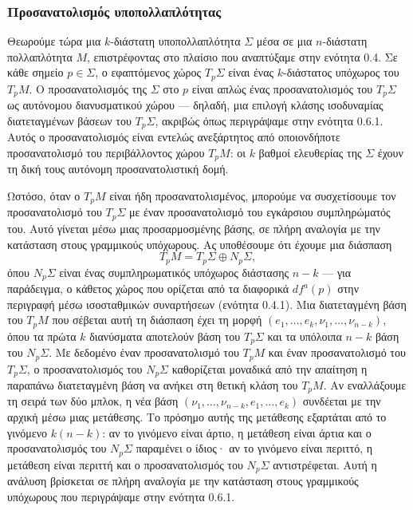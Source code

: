 \documentclass[12pt]{article}
\begin{document}
\subsubsection{Προσανατολισμός υποπολλαπλότητας}

Θεωρούμε τώρα μια $k$-διάστατη υποπολλαπλότητα $\Sigma$ μέσα σε μια $n$-διάστατη πολλαπλότητα $M$, επιστρέφοντας στο πλαίσιο που αναπτύξαμε στην ενότητα 0.4. Σε κάθε σημείο $p \in \Sigma$, ο εφαπτόμενος χώρος $T_p\Sigma$ είναι ένας $k$-διάστατος υπόχωρος του $T_pM$. Ο προσανατολισμός της $\Sigma$ στο $p$ είναι απλώς ένας προσανατολισμός του $T_p\Sigma$ ως αυτόνομου διανυσματικού χώρου --- δηλαδή, μια επιλογή κλάσης ισοδυναμίας διατεταγμένων βάσεων του $T_p\Sigma$, ακριβώς όπως περιγράψαμε στην ενότητα 0.6.1. Αυτός ο προσανατολισμός είναι εντελώς ανεξάρτητος από οποιονδήποτε προσανατολισμό του περιβάλλοντος χώρου $T_pM$: οι $k$ βαθμοί ελευθερίας της $\Sigma$ έχουν τη δική τους αυτόνομη προσανατολιστική δομή.

Ωστόσο, όταν ο $T_pM$ είναι ήδη προσανατολισμένος, μπορούμε να συσχετίσουμε τον προσανατολισμό του $T_p\Sigma$ με έναν προσανατολισμό του εγκάρσιου συμπληρώματός του. Αυτό γίνεται μέσω μιας προσαρμοσμένης βάσης, σε πλήρη αναλογία με την κατάσταση στους γραμμικούς υπόχωρους. Ας υποθέσουμε ότι έχουμε μια διάσπαση
\[
T_pM = T_p\Sigma \oplus N_p\Sigma,
\]
όπου $N_p\Sigma$ είναι ένας συμπληρωματικός υπόχωρος διάστασης $n-k$ --- για παράδειγμα, ο κάθετος χώρος που ορίζεται από τα διαφορικά $df^a(p)$ στην περιγραφή μέσω ισοσταθμικών συναρτήσεων (ενότητα 0.4.1). Μια διατεταγμένη βάση του $T_pM$ που σέβεται αυτή τη διάσπαση έχει τη μορφή $(e_1, \dots, e_k, \nu_1, \dots, \nu_{n-k})$, όπου τα πρώτα $k$ διανύσματα αποτελούν βάση του $T_p\Sigma$ και τα υπόλοιπα $n-k$ βάση του $N_p\Sigma$. Με δεδομένο έναν προσανατολισμό του $T_pM$ και έναν προσανατολισμό του $T_p\Sigma$, ο προσανατολισμός του $N_p\Sigma$ καθορίζεται μοναδικά από την απαίτηση η παραπάνω διατεταγμένη βάση να ανήκει στη θετική κλάση του $T_pM$. Αν εναλλάξουμε τη σειρά των δύο μπλοκ, η νέα βάση $(\nu_1, \dots, \nu_{n-k}, e_1, \dots, e_k)$ συνδέεται με την αρχική μέσω μιας μετάθεσης. Το πρόσημο αυτής της μετάθεσης εξαρτάται από το γινόμενο $k(n-k)$: αν το γινόμενο είναι άρτιο, η μετάθεση είναι άρτια και ο προσανατολισμός του $N_p\Sigma$ παραμένει ο ίδιος· αν το γινόμενο είναι περιττό, η μετάθεση είναι περιττή και ο προσανατολισμός του $N_p\Sigma$ αντιστρέφεται. Αυτή η ανάλυση βρίσκεται σε πλήρη αναλογία με την κατάσταση στους γραμμικούς υπόχωρους που περιγράψαμε στην ενότητα 0.6.1.
\end{document}

